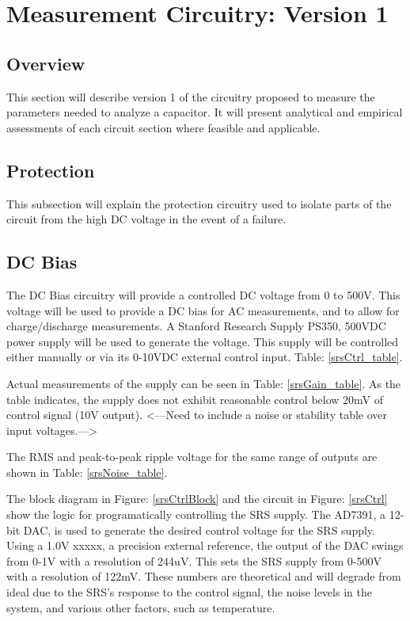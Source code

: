 \section {Measurement Circuitry: Version 1}

\subsection {Overview}

This section will describe version 1 of the circuitry proposed to measure the parameters needed to analyze a capacitor. It will present analytical and empirical assessments of each circuit section where feasible and applicable.

\subsection {Protection}

This subsection will explain the protection circuitry used to isolate parts of the circuit from the high DC voltage in the event of a failure.

\subsection {DC Bias}

The DC Bias circuitry will provide a controlled DC voltage from 0 to 500V. This voltage will be used to provide a DC bias for AC measurements, and to allow for charge/discharge measurements. A Stanford Research Supply PS350, 500VDC power supply will be used to generate the voltage. This supply will be controlled either manually or via its 0-10VDC external control input. Table: \ref{srsCtrl_table}. 



Actual measurements of the supply can be seen in Table: \ref{srsGain_table}. As the table indicates, the supply does not exhibit reasonable control below 20mV of control signal (10V output). <---Need to include a noise or stability table over input voltages.--->



The RMS and peak-to-peak ripple voltage for the same range of outputs are shown in Table: \ref{srsNoise_table}.





The block diagram in Figure: \ref{srsCtrlBlock} and the circuit in Figure: \ref{srsCtrl} show the logic for programatically controlling the SRS supply. The AD7391, a 12-bit DAC, is used to generate the desired control voltage for the SRS supply. Using a 1.0V xxxxx, a precision external reference, the output of the DAC swings from 0-1V with a resolution of 244uV. This sets the SRS supply from 0-500V with a resolution of 122mV. These numbers are theoretical and will degrade from ideal due to the SRS's response to the control signal, the noise levels in the system, and various other factors, such as temperature.

